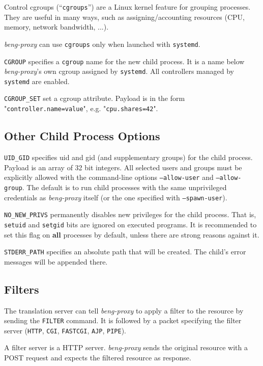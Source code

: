 \documentclass[a4paper,12pt]{article}
\begin{document}
Control cgroups (``\texttt{cgroups}'') are a Linux kernel feature for
grouping processes.  They are useful in many ways, such as
assigning/accounting resources (CPU, memory, network bandwidth, ...).

\emph{beng-proxy} can use \texttt{cgroups} only when launched with
\texttt{systemd}.

\verb|CGROUP| specifies a \texttt{cgroup} name for the new child
process.  It is a name below \emph{beng-proxy}'s own cgroup assigned
by \texttt{systemd}.  All controllers managed by \texttt{systemd} are
enabled.

\verb|CGROUP_SET| set a cgroup attribute.  Payload is in the form
"\texttt{controller.name=value}", e.g. "\texttt{cpu.shares=42}".

\subsection{Other Child Process Options}

\verb|UID_GID| specifies uid and gid (and supplementary groups) for
the child process.  Payload is an array of 32 bit integers.  All
selected users and groups must be explicitly allowed with the
command-line options \texttt{--allow-user} and \texttt{--allow-group}.
The default is to run child processes with the same unprivileged
credentials as \emph{beng-proxy} itself (or the one specified with
\texttt{--spawn-user}).

\verb|NO_NEW_PRIVS| permanently disables new privileges for the child
process.  That is, \texttt{setuid} and \texttt{setgid} bits are
ignored on executed programs.  It is recommended to set this flag on
\textbf{all} processes by default, unless there are strong reasons
against it.

\verb|STDERR_PATH| specifies an absolute path that will be created.
The child's error messages will be appended there.

\subsection{Filters}
\label{filter}

The translation server can tell \emph{beng-proxy} to apply a filter to
the resource by sending the \verb|FILTER| command.  It is followed
by a packet specifying the filter server (\verb|HTTP|,
\verb|CGI|, \verb|FASTCGI|, \verb|AJP|, \verb|PIPE|).

A filter server is a HTTP server.  \emph{beng-proxy} sends the
original resource with a POST request and expects the filtered
resource as response.
\end{document}
